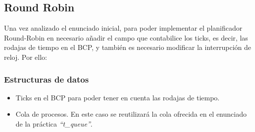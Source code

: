 \documentclass[10pt, spanish, pdftex]{template/UC3M_document}
\begin{document}
\subsection{Round Robin}
Una vez analizado el enunciado inicial, para poder implementar el planificador Round-Robin en necesario añadir el campo que contabilice los ticks, es decir, las rodajas de tiempo en el BCP, y también es necesario modificar la interrupción de reloj. Por ello:

\subsubsection{Estructuras de datos}
\vspace{-2mm}
    \begin{itemize}
     \setlength{\itemsep}{-1.5mm}
    \item Ticks en el BCP para poder tener en cuenta las rodajas de tiempo.
    \item Cola de procesos. En este caso se reutilizará la cola ofrecida en el enunciado de la práctica \textit{“t\_queue”}.
\end{itemize}
\end{document}
